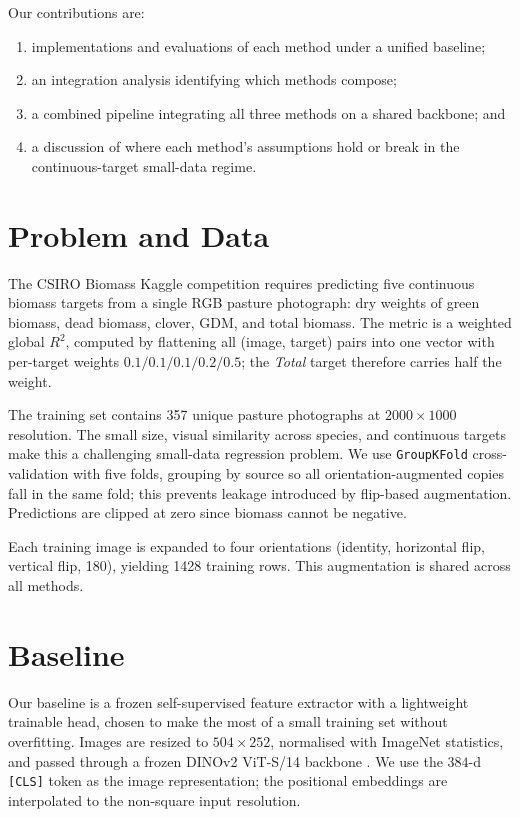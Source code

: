 \documentclass[10pt, a4paper]{article}
\begin{document}
Our contributions are:
\begin{enumerate}[label=(\arabic*)]
  \item implementations and evaluations of each method under a unified baseline;
  \item an integration analysis identifying which methods compose;
  \item a combined pipeline integrating all three methods on a shared backbone; and
  \item a discussion of where each method's assumptions hold or break in the
        continuous-target small-data regime.
\end{enumerate}

\section{Problem and Data}

The CSIRO Biomass Kaggle competition requires predicting five continuous biomass
targets from a single RGB pasture photograph: dry weights of green biomass, dead
biomass, clover, GDM, and total biomass. The metric is a weighted global
$R^{2}$, computed by flattening all (image, target) pairs into one vector with
per-target weights $0.1 / 0.1 / 0.1 / 0.2 / 0.5$; the \emph{Total} target
therefore carries half the weight.

The training set contains 357 unique pasture photographs at $2000 \times 1000$
resolution. The small size, visual similarity across species, and continuous
targets make this a challenging small-data regression problem. We use
\texttt{GroupKFold} cross-validation with five folds, grouping by source so all
orientation-augmented copies fall in the same fold; this prevents leakage
introduced by flip-based augmentation. Predictions are clipped at zero since
biomass cannot be negative.

Each training image is expanded to four orientations (identity, horizontal flip,
vertical flip, 180\textdegree), yielding 1428 training rows. This augmentation
is shared across all methods.

\section{Baseline}
\label{sec:baseline}

Our baseline is a frozen self-supervised feature extractor with a lightweight
trainable head, chosen to make the most of a small training set without
overfitting. Images are resized to $504 \times 252$, normalised with ImageNet
statistics, and passed through a frozen DINOv2 ViT-S/14 backbone
\citep{oquab2023}. We use the $384$-d \texttt{[CLS]} token as the image
representation; the positional embeddings are interpolated to the non-square
input resolution.
\end{document}
